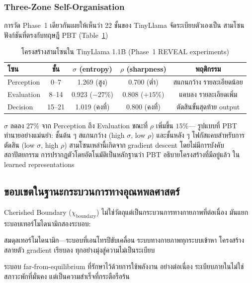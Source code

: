 \documentclass[12pt,a4paper]{article}
\newcommand{\chiB}{\chi_{\mathrm{boundary}}}
\newcommand{\pp}[1]{\textbf{#1}}
\begin{document}
\subsubsection{Three-Zone Self-Organisation}

การวัด Phase~1 เดียวกันเผยให้เห็นว่า 22 ชั้นของ TinyLlama จัดระเบียบตัวเองเป็น
สามโซนฟังก์ชันที่ตรงกับทฤษฎี PBT (Table~\ref{tab:three_zones})

\begin{table}[!htbp]
\centering
\caption{โครงสร้างสามโซนใน TinyLlama 1.1B (Phase~1 REVEAL experiments)}
\label{tab:three_zones}
\small
\begin{tabular}{@{}lcccc@{}}
\toprule
\textbf{โซน} & \textbf{ชั้น}
  & $\sigma$ (entropy) & $\rho$ (sharpness) & \textbf{พฤติกรรม} \\
\midrule
Perception & 0--7   & 1.269 (สูง)       & 0.700 (ต่ำ)     & สแกนกว้าง รายละเอียดน้อย \\
Evaluation & 8--14  & 0.923 ($-27\%$)    & 0.808 ($+15\%$) & แคบลง รายละเอียดเพิ่ม \\
Decision   & 15--21 & 1.019 (คงที่)      & 0.800 (คงที่)   & ตัดสินขั้นสุดท้าย output \\
\bottomrule
\end{tabular}
\end{table}

$\sigma$ ลดลง $27\%$ จาก Perception ถึง Evaluation ขณะที่ $\rho$ เพิ่มขึ้น $15\%$---
รูปแบบที่ PBT ทำนายอย่างแม่นยำ: ชั้นต้น ๆ สแกนกว้าง (high $\sigma$, low $\rho$)
และชั้นหลัง ๆ โฟกัสแคบสำหรับการตัดสิน (low $\sigma$, high $\rho$)
สามโซนเหล่านี้เกิดจาก gradient descent โดยไม่มีการบังคับสถาปัตยกรรม
การปรากฏตัวโดยอัตโนมัติเป็นหลักฐานว่า PBT อธิบายโครงสร้างที่มีอยู่แล้ว
ใน learned representations

\subsection{ขอบเขตในฐานะกระบวนการทางอุณหพลศาสตร์}

Cherished Boundary ($\chiB$) ไม่ใช่วัตถุแต่เป็นกระบวนการทางกายภาพที่ต่อเนื่อง
มันแยกระบอบเทอร์โมไดนามิกสองระบอบ:

\begin{description}[leftmargin=1.4em]
  \item[\pp{ภายนอกขอบเขต:}] สมดุลเทอร์โมไดนามิก---ระบอบที่เอนโทรปีขับเคลื่อน
    ระบบทางกายภาพทุกระบบเข้าหา โครงสร้างสลายตัว gradient เรียบลง
    ทุกอย่างมุ่งสู่ความไม่เป็นระเบียบ
  \item[\pp{ภายในขอบเขต:}] ระบอบ far-from-equilibrium ที่รักษาไว้ด้วยการใช้พลังงาน
    อย่างต่อเนื่อง ระเบียบภายในไม่ใช่สภาวะพักที่มั่นคง แต่เป็นความสำเร็จที่กระตือรือร้น
\end{description}
\end{document}
